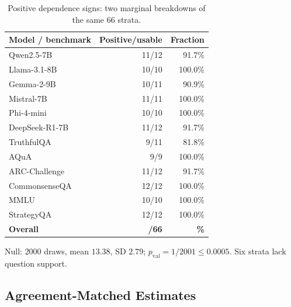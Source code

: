 \documentclass[11pt,a4paper]{article}
\theoremstyle{definition}
\newcommand{\resultcell}[1]{{\bfseries\boldmath #1}}
\begin{document}
\begin{table}[H]
\centering\small
\setlength{\tabcolsep}{3pt}
\caption{Positive dependence signs: two marginal breakdowns of the same 66 strata.}
\label{tab:instrument-results}
\begin{tabularx}{\columnwidth}{@{}Zrr@{}}
\toprule
Model / benchmark & Positive/usable & Fraction\\
\midrule
Qwen2.5-7B & 11/12 & 91.7\%\\
Llama-3.1-8B & 10/10 & 100.0\%\\
Gemma-2-9B & 10/11 & 90.9\%\\
Mistral-7B & 11/11 & 100.0\%\\
Phi-4-mini & 10/10 & 100.0\%\\
DeepSeek-R1-7B & 11/12 & 91.7\%\\
\midrule
TruthfulQA & 9/11 & 81.8\%\\
AQuA & 9/9 & 100.0\%\\
ARC-Challenge & 11/12 & 91.7\%\\
CommonsenseQA & 12/12 & 100.0\%\\
MMLU & 10/10 & 100.0\%\\
StrategyQA & 12/12 & 100.0\%\\
\midrule
{}
\resultcell{Overall} & \resultcell{63/66} & \resultcell{95.5\%}\\
\bottomrule
\end{tabularx}
\par\smallskip
\begin{minipage}{\columnwidth}\footnotesize
Null: $2000$ draws, mean $13.38$, SD $2.79$; $p_{\mathrm{val}}=1/2001\le0.0005$. Six strata lack question support.
\end{minipage}
\end{table}


\par\addvspace{1pt}


\subsection{Agreement-Matched Estimates}
\label{sec:app-tab-mechanism}
\end{document}
